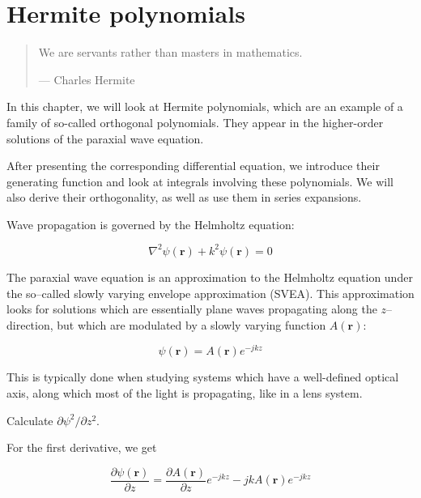 \chapter{Hermite polynomials}
\label{h:hermite}

\begin{quote}
We are servants rather than masters in mathematics.

--- Charles Hermite
\end{quote}

\chaptertoc

In this chapter, we will look at Hermite polynomials, which are an example of a family of so-called orthogonal polynomials. They appear in the higher-order solutions of the paraxial wave equation.

After presenting the corresponding differential equation, we introduce their generating function and look at integrals involving these polynomials. We will also derive their orthogonality, as well as use them in series expansions.

\pagebreak


Wave propagation is governed by the Helmholtz equation:

\begin{equation}
\nabla^2 \psi({\mathbf r}) + k^2 \psi({\mathbf r}) = 0
\end{equation}

The paraxial wave equation is an approximation to the Helmholtz equation under the so--called slowly varying envelope approximation (SVEA). This approximation looks for solutions which are essentially plane waves propagating along the $z$--direction, but which are modulated by a slowly varying function $A({\mathbf r})$:

\begin{equation}
\psi({\mathbf r}) = A({\mathbf r})e^{-jkz}
\label{eq-svea-ansatz}
\end{equation}

This is typically done when studying systems which have a well-defined optical axis, along which most of the light is propagating, like in a lens system.

\begin{cue}
Calculate $\partial \psi^2 / \partial z^2$.
\end{cue}

For the first derivative, we get

\begin{equation}
\frac{\partial \psi({\mathbf r})}{\partial z} = \frac {\partial A({\mathbf r})}{\partial z}e^{-jkz} -j k A({\mathbf r})e^{-jkz}
\end{equation} 

